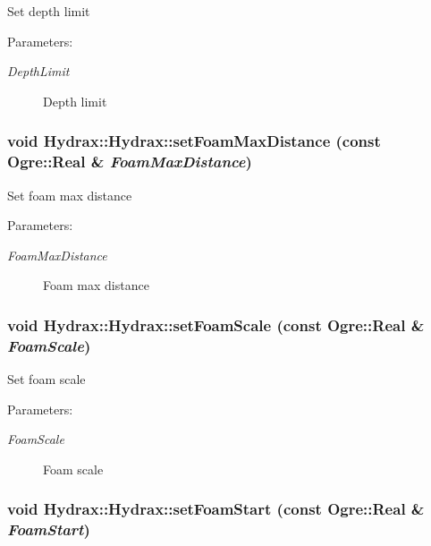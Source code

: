 Set depth limit \begin{Desc}
\item[Parameters:]
\begin{description}
\item[{\em DepthLimit}]Depth limit \end{description}
\end{Desc}
\hypertarget{class_hydrax_1_1_hydrax_7a741e312c15cc17958dd09e39b7f4fe}{
\subsubsection[{setFoamMaxDistance}]{\setlength{\rightskip}{0pt plus 5cm}void Hydrax::Hydrax::setFoamMaxDistance (const Ogre::Real \& {\em FoamMaxDistance})}}
\label{class_hydrax_1_1_hydrax_7a741e312c15cc17958dd09e39b7f4fe}


Set foam max distance \begin{Desc}
\item[Parameters:]
\begin{description}
\item[{\em FoamMaxDistance}]Foam max distance \end{description}
\end{Desc}
\hypertarget{class_hydrax_1_1_hydrax_9332262daefd2ba3ee72f8e07b642b98}{
\subsubsection[{setFoamScale}]{\setlength{\rightskip}{0pt plus 5cm}void Hydrax::Hydrax::setFoamScale (const Ogre::Real \& {\em FoamScale})}}
\label{class_hydrax_1_1_hydrax_9332262daefd2ba3ee72f8e07b642b98}


Set foam scale \begin{Desc}
\item[Parameters:]
\begin{description}
\item[{\em FoamScale}]Foam scale \end{description}
\end{Desc}
\hypertarget{class_hydrax_1_1_hydrax_5eaf61497bb4e306a64ab6828acf95e5}{
\subsubsection[{setFoamStart}]{\setlength{\rightskip}{0pt plus 5cm}void Hydrax::Hydrax::setFoamStart (const Ogre::Real \& {\em FoamStart})}}
\label{class_hydrax_1_1_hydrax_5eaf61497bb4e306a64ab6828acf95e5}


